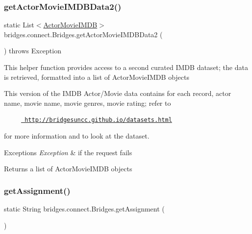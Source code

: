 \subsubsection{\texorpdfstring{getActorMovieIMDBData2()}{getActorMovieIMDBData2()}}
{\footnotesize\ttfamily static List$<$\mbox{\hyperlink{classbridges_1_1data__src__dependent_1_1_actor_movie_i_m_d_b}{Actor\+Movie\+I\+M\+DB}}$>$ bridges.\+connect.\+Bridges.\+get\+Actor\+Movie\+I\+M\+D\+B\+Data2 (\begin{DoxyParamCaption}{ }\end{DoxyParamCaption}) throws Exception\hspace{0.3cm}{\ttfamily [static]}}

This helper function provides access to a second curated I\+M\+DB dataset; the data is retrieved, formatted into a list of Actor\+Movie\+I\+M\+DB objects

This version of the I\+M\+DB Actor/\+Movie data contains for each record, actor name, movie name, movie genres, movie rating; refer to 

~~~~~\href{http://bridgesuncc.github.io/datasets.html}{\texttt{ http\+://bridgesuncc.\+github.\+io/datasets.\+html}} 

for more information and to look at the dataset.


\begin{DoxyExceptions}{Exceptions}
{\em Exception} & if the request fails\\
\hline
\end{DoxyExceptions}
\begin{DoxyReturn}{Returns}
a list of Actor\+Movie\+I\+M\+DB objects 
\end{DoxyReturn}
\mbox{\label{classbridges_1_1connect_1_1_bridges_af049c06c532987eb616156fb16ea2f43}} 
\subsubsection{\texorpdfstring{getAssignment()}{getAssignment()}}
{\footnotesize\ttfamily static String bridges.\+connect.\+Bridges.\+get\+Assignment (\begin{DoxyParamCaption}{ }\end{DoxyParamCaption})\hspace{0.3cm}{\ttfamily [static]}}


